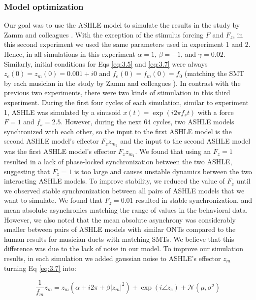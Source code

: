 \documentclass{report}
\begin{document}
\subsubsection{Model optimization}

Our goal was to use the ASHLE model to simulate the results in the study by Zamm and colleagues \cite{zamm2016endogenous}. With the exception of the stimulus forcing $F$ and $F_z$, in this second experiment we used the same parameters used in experiment 1 and 2. Hence, in all simulations in this experiment $\alpha = 1$, $\beta = −1$, and $\gamma = 0.02$. Similarly, initial conditions for Eqs \eqref{eq:3.5} and \eqref{eq:3.7} were always $z_e(0)=z_m(0)=0.001 + i0$ and $f_e(0)=f_m(0)=f_0$ (matching the SMT by each musician in the study by Zamm and colleagues \cite{zamm2016endogenous}). In contrast with the previous two experiments, there were two kinds of stimulation in this third experiment. During the first four cycles of each simulation, similar to experiment 1, ASHLE was simulated by a sinusoid $x(t)=\exp(i2\pi f_s t)$ with a force $F = 1$ and $f_s=2.5$. However, during the next 64 cycles, two ASHLE models synchronized with each other, so the input to the first ASHLE model is the second ASHLE model's effector $F_z z_{m_2}$ and the input to the second ASHLE model was the first ASHLE model's effector $F_z z_{m_1}$. We found that using an $F_z = 1$ resulted in a lack of phase-locked synchronization between the two ASHLE, suggesting that $F_z = 1$ is too large and causes unstable dynamics between the two interacting ASHLE models. To improve stability, we reduced the value of $F_z$ until we observed stable synchronization between all pairs of ASHLE models that we want to simulate. We found that $F_z = 0.01$ resulted in stable synchronization, and mean absolute asynchronies matching the range of values in the behavioral data. However, we also noted that the mean absolute asynchrony was considerably smaller between pairs of ASHLE models with similar ONTs compared to the human results for musician duets with matching SMTs. We believe that this difference was due to the lack of noise in our model. To improve our simulation results, in each simulation we added gaussian noise to ASHLE's effector $z_m$ turning Eq \eqref{eq:3.7} into:

\begin{equation}
\frac{1}{f_m}\dot{z}_m = z_m \left( \alpha + i2\pi + \beta|z_m|^2 \right) + \exp(i \angle z_e) + \mathcal{N}(\mu, \sigma^2) \label{eq:3.9}
\end{equation}
\end{document}

